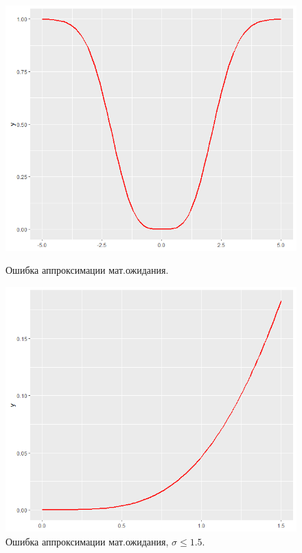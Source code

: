 \documentclass[12pt]{article}
\begin{document}
\begin{figure}[h]
	\begin{center}
		\begin{minipage}[h]{0.4\linewidth}
			\includegraphics[width=1\linewidth]{ris1.png}
			\caption{Ошибка аппроксимации мат.ожидания.} %
			\label{ris1} %
		\end{minipage}
		\hfill
		\begin{minipage}[h]{0.4\linewidth}
			\includegraphics[width=1\linewidth]{ris2.png}
			\caption{Ошибка аппроксимации мат.ожидания, $\sigma\leq 1.5.$}
			\label{ris2}
		\end{minipage}
	\end{center}
\end{figure}
\end{document}
